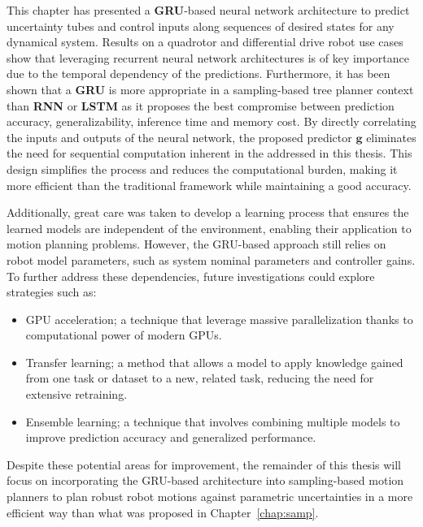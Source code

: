 This chapter has presented a \textbf{GRU}-based neural network architecture to predict uncertainty tubes and control inputs along sequences of desired states for any dynamical system.
Results on a quadrotor and differential drive robot use cases show that leveraging recurrent neural network architectures is of key importance due to the temporal dependency of the predictions.
Furthermore, it has been shown that a \textbf{GRU} is more appropriate in a sampling-based tree planner context than \textbf{RNN} or \textbf{LSTM} as it proposes the best compromise between prediction accuracy, generalizability, inference time and memory cost.
By directly correlating the inputs and outputs of the neural network, the proposed predictor $\boldsymbol{g}$ eliminates the need for sequential computation inherent in the  addressed in this thesis. 
This design simplifies the process and reduces the computational burden, making it more efficient than the traditional  framework while maintaining a good accuracy.

Additionally, great care was taken to develop a learning process that ensures the learned models are independent of the environment, enabling their application to motion planning problems. 
However, the GRU-based approach still relies on robot model parameters, such as system nominal parameters and controller gains. 
To further address these dependencies, future investigations could explore strategies such as:
\begin{itemize}
    \item GPU acceleration; a technique that leverage massive parallelization thanks to computational power of modern GPUs.
    \item Transfer learning; a method that allows a model to apply knowledge gained from one task or dataset to a new, related task, reducing the need for extensive retraining.
    \item Ensemble learning; a technique that involves combining multiple models to improve prediction accuracy and generalized performance.
\end{itemize}

Despite these potential areas for improvement, the remainder of this thesis will focus on incorporating the GRU-based architecture into sampling-based motion planners to plan robust robot motions against parametric uncertainties in a more efficient way than what was proposed in Chapter~\ref{chap:samp}.
